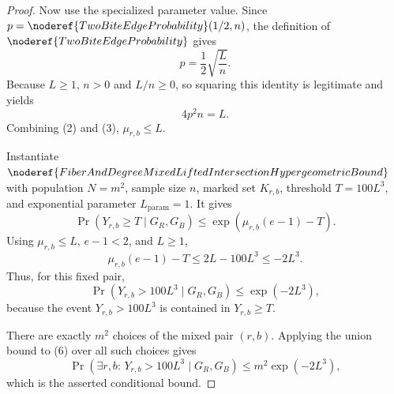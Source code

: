 \begin{proof}
Now use the specialized parameter value.  Since
\(p=\noderef{TwoBiteEdgeProbability}(1/2,n)\), the definition of
\(\noderef{TwoBiteEdgeProbability}\) gives
\[
p=\frac12\sqrt{\frac Ln}.
\]
Because \(L\ge1\), \(n>0\) and \(L/n\ge0\), so squaring this identity is
legitimate and yields
\[
4p^2n=L.
\tag{3}
\]
Combining (2) and (3), \(\mu_{r,b}\le L\).

Instantiate \(\noderef{FiberAndDegreeMixedLiftedIntersectionHypergeometricBound}\)
with population \(N=m^2\), sample size \(n\), marked set \(K_{r,b}\),
threshold \(T=100L^3\), and exponential parameter \(L_{\mathrm{param}}=1\).
It gives
\[
\Pr(Y_{r,b}\ge T\mid G_R,G_B)
\le \exp(\mu_{r,b}(e-1)-T).
\tag{4}
\]
Using \(\mu_{r,b}\le L\), \(e-1<2\), and \(L\ge1\),
\[
\mu_{r,b}(e-1)-T
\le 2L-100L^3
\le -2L^3.
\tag{5}
\]
Thus, for this fixed pair,
\[
\Pr(Y_{r,b}>100L^3\mid G_R,G_B)
\le \exp(-2L^3),
\tag{6}
\]
because the event \(Y_{r,b}>100L^3\) is contained in
\(Y_{r,b}\ge T\).

There are exactly \(m^2\) choices of the mixed pair \((r,b)\).  Applying the
union bound to (6) over all such choices gives
\[
\Pr(\exists r,b:\,Y_{r,b}>100L^3\mid G_R,G_B)
\le m^2\exp(-2L^3),
\]
which is the asserted conditional bound.
\end{proof}
